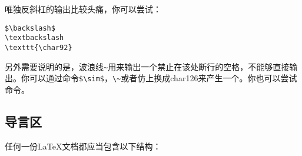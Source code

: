 唯独反斜杠的输出比较头痛，你可以尝试：
\begin{verbatim}
$\backslash$
\textbackslash
\texttt{\char92}
\end{verbatim}

另外需要说明的是，波浪线{\texttt{\~}}用来输出一个禁止在该处断行的空格，不能够直接输出。你可以通过命令\verb+$\sim$+，\verb|\~|或者仿上换成char126来产生一个。你也可以尝试命令\latexline{\\textasciitilde}。

\subsection{导言区}
任何一份\LaTeX{}文档都应当包含以下结构：

